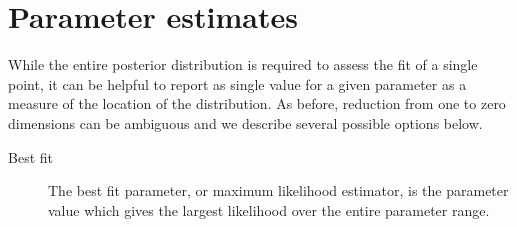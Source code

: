 \section{Parameter estimates}

While the entire posterior distribution is required to assess the fit of a single point, it can be helpful to report as single value for a given parameter as a measure of the location of the distribution. As before, reduction from one to zero dimensions can be ambiguous and we describe several possible options below.

\begin{description}
\item[Best fit] The best fit parameter, or maximum likelihood estimator, is the parameter value which gives the largest likelihood over the entire parameter range.

\end{description}

